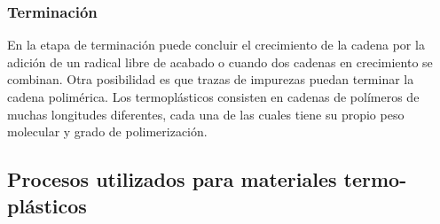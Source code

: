 \documentclass[a4paper, 11pt]{article}
\begin{document}
\subsubsection{Terminación}
En la etapa de terminación puede concluir el crecimiento de la cadena por la adición de un radical libre de acabado o cuando dos cadenas en crecimiento se combinan. Otra posibilidad es que trazas de impurezas puedan terminar la cadena polimérica. Los termoplásticos consisten en cadenas de polímeros de muchas longitudes diferentes, cada una de las cuales tiene su propio peso molecular y grado de polimerización.

\subsection{Procesos utilizados para materiales termo-plásticos}
\end{document}
